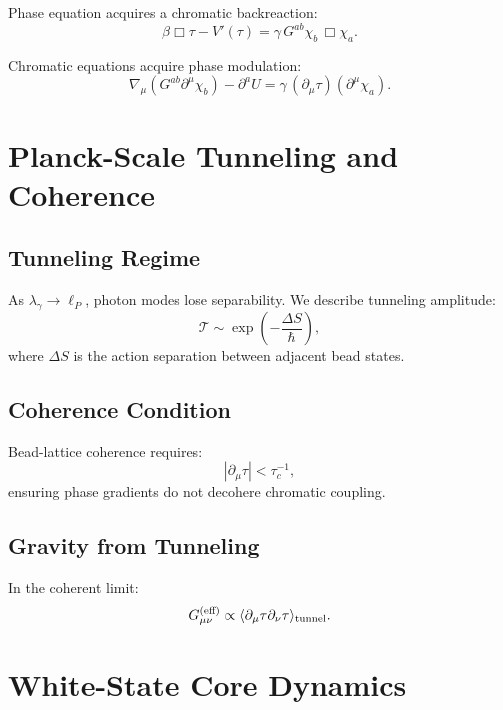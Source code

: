 Phase equation acquires a chromatic backreaction:
\[
\beta \Box \tau - V'(\tau)
=
\gamma\, G^{ab}\chi_b\,\Box\chi_a .
\]

Chromatic equations acquire phase modulation:
\[
\nabla_\mu(G^{ab}\partial^\mu\chi_b)
- \partial^a U
=
\gamma\,(\partial_\mu\tau)(\partial^\mu\chi_a).
\]


\chapter{Planck-Scale Tunneling and Coherence}

\section{Tunneling Regime}

As $\lambda_\gamma\to \ell_P$, photon modes lose separability.  
We describe tunneling amplitude:
\[
\mathcal{T} 
\sim 
\exp\left(-\frac{\Delta S}{\hbar}\right),
\]
where $\Delta S$ is the action separation between adjacent bead states.

\section{Coherence Condition}

Bead-lattice coherence requires:
\[
|\partial_\mu\tau| < \tau_c^{-1},
\]
ensuring phase gradients do not decohere chromatic coupling.

\section{Gravity from Tunneling}

In the coherent limit:
\[
G_{\mu\nu}^{(\text{eff})}
\propto
\langle \partial_\mu \tau \partial_\nu\tau \rangle_{\rm tunnel}.
\]


\chapter{White-State Core Dynamics}

